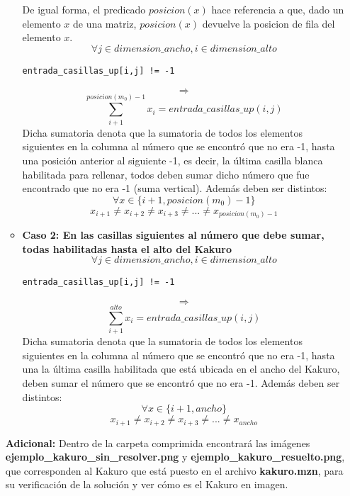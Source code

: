 \documentclass[12pt]{article}
\begin{document}
\begin{itemize}
\begin{itemize}
\\ \\
De igual forma, el predicado $posicion(x)$ hace referencia a que, dado un elemento $x$ de una matriz, $posicion(x)$ devuelve la posicion de fila del elemento $x$.
\begin{equation*}
\forall j \in dimension\_ancho, i \in dimension\_alto
\end{equation*}
\begin{verbatim}
entrada_casillas_up[i,j] != -1
\end{verbatim}
\begin{equation*}
\Rightarrow
\end{equation*}
\begin{equation*}
\sum_{i+1}^{posicion(m_0)-1} x_{i} = entrada\_casillas\_up(i,j)
\end{equation*}
Dicha sumatoria denota que la sumatoria de todos los elementos siguientes en la columna al número que se encontró que no era -1, hasta una posición anterior al siguiente -1, es decir, la última casilla blanca habilitada para rellenar, todos deben sumar dicho número que fue encontrado que no era -1 (suma vertical). Además deben ser distintos:
\begin{equation*}
\forall x \in \{i+1,posicion(m_0)-1\}
\end{equation*}
\begin{equation*}
x_{i+1} \neq x_{i+2} \neq x_{i+3} \neq ... \neq x_{posicion(m_0)-1}
\end{equation*}
\item \textbf{Caso 2: En las casillas siguientes al número que debe sumar, todas habilitadas hasta el alto del Kakuro}
\begin{equation*}
\forall j \in dimension\_ancho, i \in dimension\_alto
\end{equation*}
\begin{verbatim}
entrada_casillas_up[i,j] != -1
\end{verbatim}
\begin{equation*}
\Rightarrow
\end{equation*}
\begin{equation*}
\sum_{i+1}^{alto} x_{i} = entrada\_casillas\_up(i,j)
\end{equation*}
Dicha sumatoria denota que la sumatoria de todos los elementos siguientes en la columna al número que se encontró que no era -1, hasta una la última casilla habilitada que está ubicada en el ancho del Kakuro, deben sumar el número que se encontró que no era -1. Además deben ser distintos:
\begin{equation*}
\forall x \in \{i+1,ancho\}
\end{equation*}
\begin{equation*}
x_{i+1} \neq x_{i+2} \neq x_{i+3} \neq ... \neq x_{ancho}
\end{equation*}
\end{itemize}
\textbf{Adicional:} Dentro de la carpeta comprimida encontrará las imágenes \textbf{ejemplo\_kakuro\_sin\_resolver.png} y \textbf{ejemplo\_kakuro\_resuelto.png}, que corresponden al Kakuro que está puesto en el archivo \textbf{kakuro.mzn}, para su verificación de la solución y ver cómo es el Kakuro en imagen.
\end{itemize}
\end{document}
